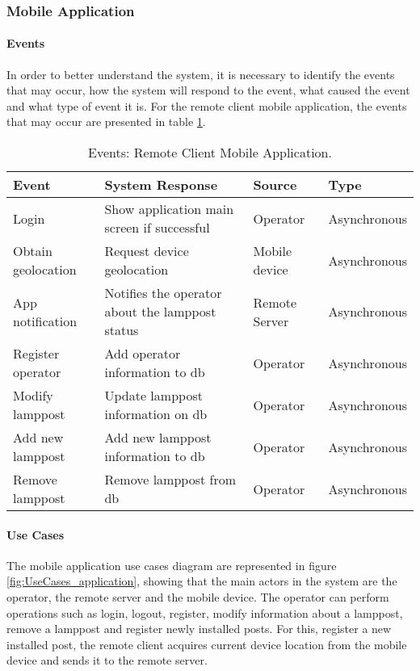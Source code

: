 \subsubsection{Mobile Application}
\paragraph*{Events}
In order to better understand the system, it is necessary to identify the events that may occur, how the system will respond to the event, what caused the event and what type of event it is. For the remote client mobile application, the events that may occur are presented in table \ref{table:rc_app_events}.

\begin{table}[ht]
	\centering
	\resizebox{\columnwidth}{!}
	{
		\begin{tabular}{|m{3cm}|m{5cm}|m{2.4cm}|m{2.4cm}|}
			\hline
			\textbf{Event} & \textbf{System Response} & \textbf{Source} & \textbf{Type}\\
			\hline\hline
			Login & Show application main screen if successful & Operator & Asynchronous\\
			\hline
			
			Obtain geolocation & Request device geolocation & Mobile device & Asynchronous\\
			\hline
			
			App notification & Notifies the operator about the lamppost status & Remote Server & Asynchronous\\
			\hline
			
			Register operator & Add operator information to \ac{db} & Operator & Asynchronous\\
			\hline
			
			Modify lamppost & Update lamppost information on \ac{db} & Operator & Asynchronous\\
			\hline
			
			Add new lamppost & Add new lamppost information to \ac{db} & Operator & Asynchronous\\
			\hline			
			
			Remove lamppost & Remove lamppost  from \ac{db} & Operator & Asynchronous\\
			\hline			
		\end{tabular}
	}
	\caption{Events: Remote Client Mobile Application.}
	\label{table:rc_app_events}
\end{table}

\paragraph*{Use Cases}
The mobile application use cases diagram are represented in figure \ref{fig:UseCases_application}, showing that the main actors in the system are the operator, the remote server and the mobile device. The operator can perform operations such as login, logout, register, modify information about a lamppost, remove a lamppost and register newly installed posts. For this, register a new installed post, the remote client acquires current device location from the mobile device and sends it to the remote server.

